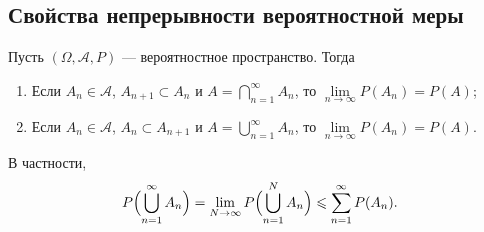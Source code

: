 \sectionbreak
\subsection{Свойства непрерывности вероятностной меры}

\begin{corollary*}
    Пусть $(\Omega, \mathcal{A}, P)$ --- вероятностное пространство.
    Тогда
    \begin{enumerate}
        \item Если $A_n \in \mathcal{A}$, $A_{n + 1} \subset A_n$ и $A = \bigcap\limits_{n = 1}^\infty A_n$, то $\lim\limits_{n \to \infty} P(A_n) = P(A)$;
        \item Если $A_n \in \mathcal{A}$, $A_n \subset A_{n + 1}$ и $A = \bigcup\limits_{n = 1}^\infty A_n$, то $\lim\limits_{n \to \infty} P(A_n) = P(A)$.
    \end{enumerate}
\end{corollary*}

В частности,
\[
    P \Bigl(\bigcup\limits_{n = 1}^\infty A_n\Bigr) = \lim\limits_{N \to \infty} P\Bigl(\bigcup\limits_{n = 1}^N A_n\Bigr) \leqslant \sum\limits_{n = 1}^{\infty} P(A_n).
\]